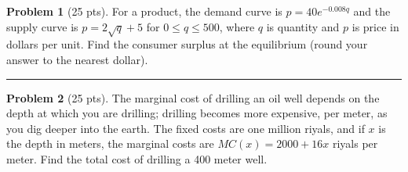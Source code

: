 \documentclass[12pt]{article}
\theoremstyle{definition}
\newtheorem{problem}{Problem}
\begin{document}
\bigskip
\begin{problem}[25 pts]
For a product, the demand curve is $p=40e^{-0.008q}$ and the supply curve is $p=2\sqrt{q}+5$ for $0 \leq q \leq 500$, where $q$ is quantity and $p$ is price in dollars per unit.  Find the consumer surplus at the equilibrium (round your answer to the nearest dollar).
\vspace{10cm}
\end{problem}
\hrule

\begin{problem}[25 pts]
The marginal cost of drilling an oil well depends on the depth at which you are drilling;  drilling becomes more expensive, per meter, as you dig deeper into the earth.  The fixed costs are one million riyals, and if $x$ is the depth in meters, the marginal costs are $MC(x) = 2000 + 16x$ riyals per meter.  Find the total cost of drilling a 400 meter well.
\end{problem}
\end{document}
